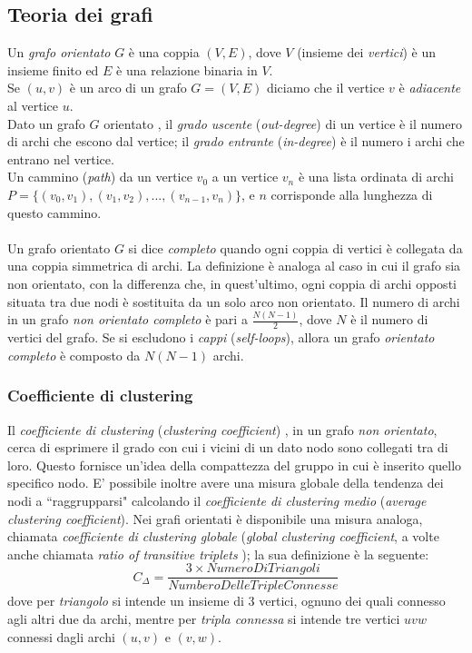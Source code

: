 \documentclass[a4paper,12pt]{article}
\begin{document}
\subsection{Teoria dei grafi}
\label{subsec:graph}
Un \textit{grafo orientato} $G$ \cite{cormen} è una coppia $(V,E)$, dove $V$ (insieme dei \textit{vertici}) è un insieme finito ed $E$ è una relazione binaria in $V$.\\
Se $(u,v)$ è un arco \cite{cormen} di un grafo $G = (V,E)$ diciamo che il vertice $v$ è \textit{adiacente} al vertice $u$.\\
Dato un grafo $G$ orientato \cite{cormen}, il \textit{grado uscente} (\textit{out-degree}) di un vertice è il numero di archi che escono dal vertice; il \textit{grado entrante} (\textit{in-degree}) è il numero i archi che entrano nel vertice. \\
Un cammino (\textit{path}) \cite{barabasi} da un vertice $v_0$ a un vertice $v_n$ è una lista ordinata di archi $P = \{(v_0,v_1),(v_1,v_2),...,(v_{n-1},v_n)\}$, e $n$ corrisponde alla lunghezza di questo cammino. \\
\\
Un grafo orientato $G$ si dice \textit{completo} \cite{barabasi} quando ogni coppia di vertici è collegata da una coppia simmetrica di archi. La definizione è analoga al caso in cui il grafo sia non orientato, con la differenza che, in quest'ultimo, ogni coppia di archi opposti situata tra due nodi è sostituita da un solo arco non orientato. Il numero di archi \cite{barabasi} in un grafo \textit{non orientato completo} è pari a $\tfrac{N(N-1)}{2}$, dove $N$ è il numero di vertici del grafo. Se si escludono i \textit{cappi} (\textit{self-loops}), allora un grafo \textit{orientato completo} è composto da $N(N-1)$ archi. 
\subsubsection{Coefficiente di clustering}
Il \textit{coefficiente di clustering} (\textit{clustering coefficient}) \cite{barabasi}, in un grafo \textit{non orientato}, cerca di esprimere il grado con cui i vicini di un dato nodo sono collegati tra di loro. Questo fornisce un'idea della compattezza del gruppo in cui è inserito quello specifico nodo. E' possibile inoltre avere una misura globale della tendenza dei nodi a ``raggrupparsi" calcolando il \textit{coefficiente di clustering medio} (\textit{average clustering coefficient}). Nei grafi orientati  \cite{newman} è disponibile una misura analoga, chiamata \textit{coefficiente di clustering globale} (\textit{global clustering coefficient}, a volte anche chiamata \textit{ratio of transitive triplets} \cite{barabasi}); la sua definizione è la seguente:
\begin{equation}
C_\Delta=\dfrac{3\times NumeroDiTriangoli}{NumberoDelleTripleConnesse}
\end{equation}
dove per \textit{triangolo} si intende un insieme di $3$ vertici, ognuno dei quali connesso agli altri due da archi, mentre per \textit{tripla connessa} si intende tre vertici $uvw$ connessi dagli archi $(u,v)$ e $(v,w)$.
\end{document}
